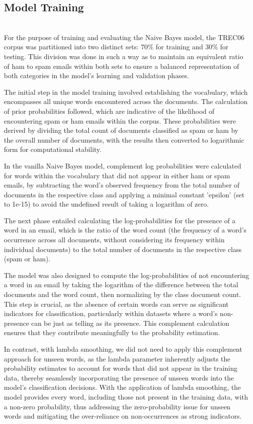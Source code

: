 \documentclass{acm_proc_article-sp}
\begin{document}
\subsection{Model Training}~\\
For the purpose of training and evaluating the Naive Bayes model, the TREC06 corpus was partitioned into two distinct sets: 70\% for training and 30\% for testing. This division was done in such a way as to maintain an equivalent ratio of ham to spam emails within both sets to ensure a balanced representation of both categories in the model's learning and validation phases.

The initial step in the model training involved establishing the vocabulary, which encompasses all unique words encountered across the documents. The calculation of prior probabilities followed, which are indicative of the likelihood of encountering spam or ham emails within the corpus. These probabilities were derived by dividing the total count of documents classified as spam or ham by the overall number of documents, with the results then converted to logarithmic form for computational stability.

In the vanilla Naive Bayes model, complement log probabilities were calculated for words within the vocabulary that did not appear in either ham or spam emails, by subtracting the word's observed frequency from the total number of documents in the respective class and applying a minimal constant 'epsilon' (set to 1e-15) to avoid the undefined result of taking a logarithm of zero. 

The next phase entailed calculating the log-probabilities for the presence of a word in an email, which is the ratio of the word count (the frequency of a word's occurrence across all documents, without considering its frequency within individual documents) to the total number of documents in the respective class (spam or ham).

The model was also designed to compute the log-probabilities of not encountering a word in an email by taking the logarithm of the difference between the total documents and the word count, then normalizing by the class document count. This step is crucial, as the absence of certain words can serve as significant indicators for classification, particularly within datasets where a word's non-presence can be just as telling as its presence.  This complement calculation ensures that they contribute meaningfully to the probability estimation. 

In contrast, with lambda smoothing, we did not need to apply this complement approach for unseen words, as the lambda parameter inherently adjusts the probability estimates to account for words that did not appear in the training data, thereby seamlessly incorporating the presence of unseen words into the model's classification decisions. With the application of lambda smoothing, the model provides every word, including those not present in the training data, with a non-zero probability, thus addressing the zero-probability issue for unseen words and mitigating the over-reliance on non-occurrences as strong indicators.
\end{document}
